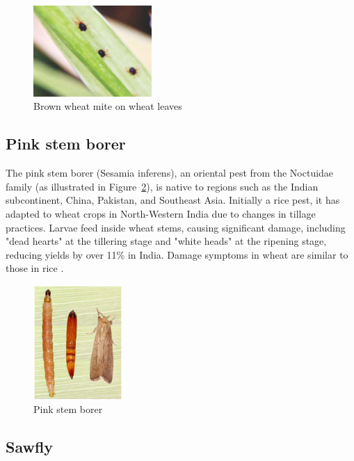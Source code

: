 \begin{figure}[H]
    \centering
    \includegraphics[width=0.4\textwidth]{chapters/chapter2/images/Figure15.png}
    \caption{Brown wheat mite on wheat leaves  \protect\parencite{kashyap2018identification}}
    \label{fig:Figure15}
\end{figure}

\subsection{Pink stem borer}
The pink stem borer (Sesamia inferens), an oriental pest from the Noctuidae family (as illustrated in Figure~\ref{fig:Figure16}), is native to regions such as the Indian subcontinent, China, Pakistan, and Southeast Asia. Initially a rice pest, it has adapted to wheat crops in North-Western India due to changes in tillage practices. Larvae feed inside wheat stems, causing significant damage, including "dead hearts" at the tillering stage and "white heads" at the ripening stage, reducing yields by over 11\% in India. Damage symptoms in wheat are similar to those in rice \parencite{farook2019insect}.

\begin{figure}[H]
    \centering
    \includegraphics[width=0.3\textwidth]{chapters/chapter2/images/Figure16.png}
    \caption{Pink stem borer  \protect\parencite{farook2019insect}}
    \label{fig:Figure16}
\end{figure}


\subsection{Sawfly} 

